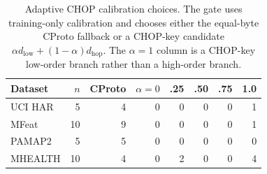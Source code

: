 \begin{table}[t]
\centering
\caption{Adaptive CHOP calibration choices. The gate uses training-only calibration and chooses either the equal-byte CProto fallback or a CHOP-key candidate \(\alpha d_{\mathrm{low}}+(1-\alpha)d_{\mathrm{hop}}\). The \(\alpha=1\) column is a CHOP-key low-order branch rather than a high-order branch.}
\label{tab:adaptive-chop-gate}
\begin{tabular}{lrrrrrrr}
\toprule
Dataset & \(n\) & CProto & \(\alpha=0\) & .25 & .50 & .75 & 1.0 \\
\midrule
UCI HAR & 5 & 4 & 0 & 0 & 0 & 0 & 1 \\
MFeat & 10 & 9 & 0 & 0 & 0 & 0 & 1 \\
PAMAP2 & 5 & 5 & 0 & 0 & 0 & 0 & 0 \\
MHEALTH & 10 & 4 & 0 & 2 & 0 & 0 & 4 \\
\bottomrule
\end{tabular}
\end{table}
